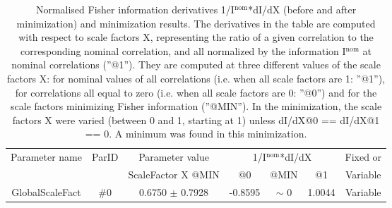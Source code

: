\begin{table}[H]
\scriptsize
\begin{center}
\renewcommand{\arraystretch}{1.1}
\begin{tabular}{|c|c|c|ccc|c|}
\hline
Parameter name & ParID & Parameter value &\multicolumn{3}{|c|}{1/I$^\mathrm{nom}$*dI/dX} & Fixed or\\
 & & ScaleFactor X @MIN & @0 & @MIN & @1 & Variable\\
\hline
 {\tiny GlobalScaleFact} & \#0 &    0.6750 $\pm$    0.7928 &   -0.8595 & {\tiny $\sim$ }0 &    1.0044 & Variable \\
\hline
\end{tabular}
\renewcommand{\arraystretch}{1}
\caption{Normalised Fisher information derivatives 1/I$^\mathrm{nom}$*dI/dX (before and after minimization) and minimization results.  The derivatives in the table are computed with respect to scale factors X, representing the ratio of a given correlation to the corresponding nominal correlation, and all normalized by the information I$^\mathrm{nom}$ at nominal correlations (''@1''). They are computed at three different values of the scale factors X: for nominal values of all correlations (i.e. when all scale factors are 1: ''@1''), for correlations all equal to zero (i.e. when all scale factors are 0: ''@0'') and for the scale factors minimizing Fisher information (''@MIN''). In the minimization, the scale factors X were varied (between 0 and 1, starting at 1) unless dI/dX@0 == dI/dX@1 == 0. A minimum was found in this minimization.}
\end{center}
\end{table}

